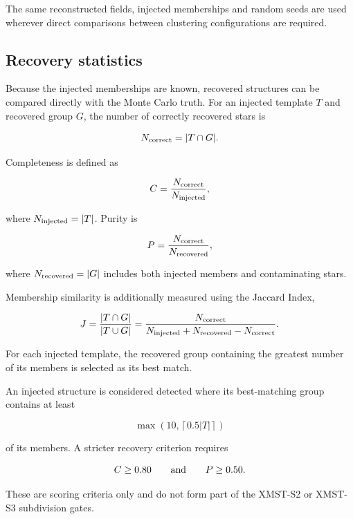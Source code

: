 \documentclass[fleqn,usenatbib]{rasti}
\begin{document}
The same reconstructed fields, injected memberships and random seeds are
used wherever direct comparisons between clustering configurations are
required.


\subsection{Recovery statistics}

Because the injected memberships are known, recovered structures can be
compared directly with the Monte Carlo truth. For an injected template $T$
and recovered group $G$, the number of correctly recovered stars is

\[
N_{\rm correct}=|T\cap G|.
\]

Completeness is defined as

\begin{equation}
C =
\frac{N_{\rm correct}}
     {N_{\rm injected}},
\label{eq:completeness}
\end{equation}

where $N_{\rm injected}=|T|$. Purity is

\begin{equation}
P =
\frac{N_{\rm correct}}
     {N_{\rm recovered}},
\label{eq:purity}
\end{equation}

where $N_{\rm recovered}=|G|$ includes both injected members and
contaminating stars.

Membership similarity is additionally measured using the Jaccard Index,

\begin{equation}
J =
\frac{|T\cap G|}
     {|T\cup G|}
=
\frac{N_{\rm correct}}
     {N_{\rm injected}+N_{\rm recovered}-N_{\rm correct}}.
\label{eq:jaccard}
\end{equation}

For each injected template, the recovered group containing the greatest
number of its members is selected as its best match.

An injected structure is considered detected where its best-matching group
contains at least

\[
\max\left(10,\left\lceil0.5|T|\right\rceil\right)
\]

of its members. A stricter recovery criterion requires

\[
C\geq0.80
\qquad {\rm and} \qquad
P\geq0.50.
\]

These are scoring criteria only and do not form part of the XMST-S2 or
XMST-S3 subdivision gates.
\end{document}
